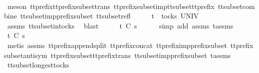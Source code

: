 \ \ \ \ \isamarkupfalse%
\ {\isacharparenleft}meson\ tt{\isacharunderscore}prefix{\isacharunderscore}tt{\isacharunderscore}prefix{\isacharunderscore}subset{\isacharunderscore}trans\ tt{\isacharunderscore}prefix{\isacharunderscore}subset{\isacharunderscore}imp{\isacharunderscore}tt{\isacharunderscore}subset{\isacharunderscore}tt{\isacharunderscore}prefix\ tt{\isacharunderscore}subset{\isacharunderscore}combine\ tt{\isacharunderscore}subset{\isacharunderscore}imp{\isacharunderscore}prefix{\isacharunderscore}subset\ tt{\isacharunderscore}subset{\isacharunderscore}refl{\isacharparenright}\isanewline
\ \ \isamarkupfalse%
\ \isamarkupfalse%
\ {\isachardoublequoteopen}t{\isacharprime}\ {\isasymin}\ tocks\ UNIV{\isachardoublequoteclose}\isanewline
\ \ \ \ \isamarkupfalse%
\ assms{\isacharparenleft}{}{\isacharparenright}\ tt{\isacharunderscore}subset{\isacharunderscore}in{\isacharunderscore}tocks{}\ \isamarkupfalse%
\ blast\isanewline
\ \ \isamarkupfalse%
\ \isamarkupfalse%
\ {\isachardoublequoteopen}t{\isacharprime}\ {\isasymle}\isactrlsub C\ s{}{\isachardoublequoteclose}\isanewline
\ \ \ \ \isamarkupfalse%
\ {\isacharparenleft}simp\ add{\isacharcolon}\ assms{\isacharparenleft}{}{\isacharparenright}\ t{\isacharprime}{\isacharunderscore}assms{\isacharparenright}\isanewline
\ \ \isamarkupfalse%
\ \isamarkupfalse%
\ {\isachardoublequoteopen}t\ {\isasymle}\isactrlsub C\ s{}{\isachardoublequoteclose}\isanewline
\ \ \ \ \isamarkupfalse%
\ {\isacharparenleft}metis\ assms{\isacharparenleft}{}{\isacharparenright}\ tt{\isacharunderscore}prefix{\isacharunderscore}append{\isacharunderscore}split\ tt{\isacharunderscore}prefix{\isacharunderscore}concat\ tt{\isacharunderscore}prefix{\isacharunderscore}imp{\isacharunderscore}prefix{\isacharunderscore}subset\ tt{\isacharunderscore}prefix{\isacharunderscore}subset{\isacharunderscore}antisym\ tt{\isacharunderscore}prefix{\isacharunderscore}subset{\isacharunderscore}tt{\isacharunderscore}prefix{\isacharunderscore}trans\ tt{\isacharunderscore}subset{\isacharunderscore}imp{\isacharunderscore}prefix{\isacharunderscore}subset\ t{\isacharprime}{\isacharunderscore}assms{\isacharparenright}\isanewline
{}\isamarkupfalse%
%
\endisatagproof
{\isafoldproof}%
%
\isadelimproof
\isanewline
%
\endisadelimproof
\isanewline
{}\isamarkupfalse%
\ tt{\isacharunderscore}subset{\isacharunderscore}longest{\isacharunderscore}tocks{}{\isacharcolon}\isanewline
